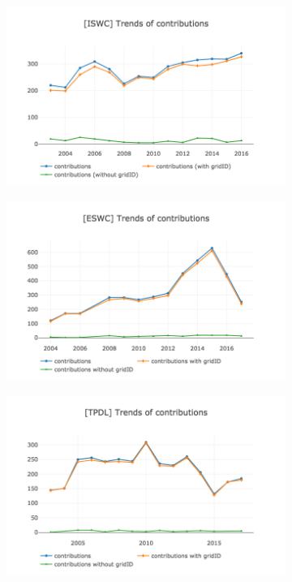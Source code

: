 \documentclass{llncs}
\begin{document}
\begin{figure}[t]
\begin{subfigure}{.5\textwidth}
	\centering
	\includegraphics[width=\textwidth]{images/iswc_contributions.png}
	\caption[ ]{}
	\label{fig:iswc_contributions}
\end{subfigure}%
\begin{subfigure}{.5\textwidth}
	\centering
	\includegraphics[width=\textwidth]{images/eswc_contributions.png}
	\caption[ ]{}
	\label{fig:eswc_contributions}
\end{subfigure}
	\centering
\begin{subfigure}{.5\textwidth}
	\centering
	\includegraphics[width=\textwidth]{images/tpdl_contributions.png}

\end{subfigure}
\end{figure}
\end{document}
